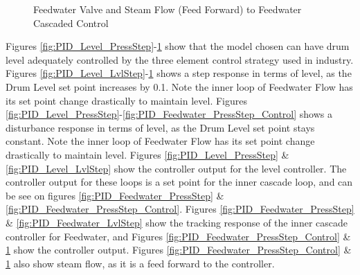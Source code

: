    \begin{figure}[ht]
        \begin{center}
            \caption{Feedwater Valve and Steam Flow (Feed Forward) to Feedwater Cascaded Control}
            \label{fig:PID_Feedwater_LvlStep_Control} 
        \end{center}
    \end{figure}   %
    
    Figures \ref{fig:PID_Level_PressStep}-\ref{fig:PID_Feedwater_LvlStep_Control} show that the model chosen can have drum level adequately controlled by the three element control strategy used in industry. Figures \ref{fig:PID_Level_LvlStep}-\ref{fig:PID_Feedwater_LvlStep_Control} shows a step response in terms of level, as the Drum Level set point increases by 0.1. Note the inner loop of Feedwater Flow has its set point change drastically to maintain level. Figures \ref{fig:PID_Level_PressStep}-\ref{fig:PID_Feedwater_PressStep_Control} shows a disturbance response in terms of level, as the Drum Level set point stays constant. Note the inner loop of Feedwater Flow has its set point change drastically to maintain level. Figures \ref{fig:PID_Level_PressStep} \& \ref{fig:PID_Level_LvlStep} show the controller output for the level controller. The controller output for these loops is a set point for the inner cascade loop, and can be see on figures \ref{fig:PID_Feedwater_PressStep} \& \ref{fig:PID_Feedwater_PressStep_Control}. Figures \ref{fig:PID_Feedwater_PressStep} \& \ref{fig:PID_Feedwater_LvlStep} show the tracking response of the inner cascade controller for Feedwater, and Figures \ref{fig:PID_Feedwater_PressStep_Control} \& \ref{fig:PID_Feedwater_LvlStep_Control} show the controller output. Figures \ref{fig:PID_Feedwater_PressStep_Control} \& \ref{fig:PID_Feedwater_LvlStep_Control} also show steam flow, as it is a feed forward to the controller. 
    
